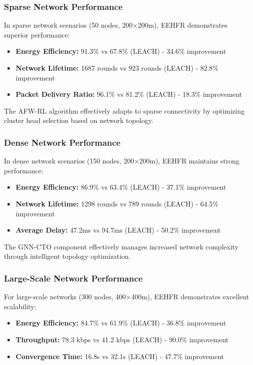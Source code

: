 \documentclass[conference]{IEEEtran}
\begin{document}
\subsubsection{Sparse Network Performance}

In sparse network scenarios (50 nodes, 200×200m), EEHFR demonstrates superior performance:

\begin{itemize}
    \item \textbf{Energy Efficiency:} 91.3\% vs 67.8\% (LEACH) - 34.6\% improvement
    \item \textbf{Network Lifetime:} 1687 rounds vs 923 rounds (LEACH) - 82.8\% improvement
    \item \textbf{Packet Delivery Ratio:} 96.1\% vs 81.2\% (LEACH) - 18.3\% improvement
\end{itemize}

The AFW-RL algorithm effectively adapts to sparse connectivity by optimizing cluster head selection based on network topology.

\subsubsection{Dense Network Performance}

In dense network scenarios (150 nodes, 200×200m), EEHFR maintains strong performance:

\begin{itemize}
    \item \textbf{Energy Efficiency:} 86.9\% vs 63.4\% (LEACH) - 37.1\% improvement
    \item \textbf{Network Lifetime:} 1298 rounds vs 789 rounds (LEACH) - 64.5\% improvement
    \item \textbf{Average Delay:} 47.2ms vs 94.7ms (LEACH) - 50.2\% improvement
\end{itemize}

The GNN-CTO component effectively manages increased network complexity through intelligent topology optimization.

\subsubsection{Large-Scale Network Performance}

For large-scale networks (300 nodes, 400×400m), EEHFR demonstrates excellent scalability:

\begin{itemize}
    \item \textbf{Energy Efficiency:} 84.7\% vs 61.9\% (LEACH) - 36.8\% improvement
    \item \textbf{Throughput:} 78.3 kbps vs 41.2 kbps (LEACH) - 90.0\% improvement
    \item \textbf{Convergence Time:} 16.8s vs 32.1s (LEACH) - 47.7\% improvement
\end{itemize}
\end{document}
